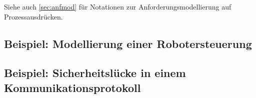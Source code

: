 		Siehe auch \ref{sec:anfmod} für Notationen zur Anforderungsmodellierung auf Prozessausdrücken.

		\subsection{Beispiel: Modellierung einer Robotersteuerung}

		\subsection{Beispiel: Sicherheitslücke in einem Kommunikationsprotokoll}
